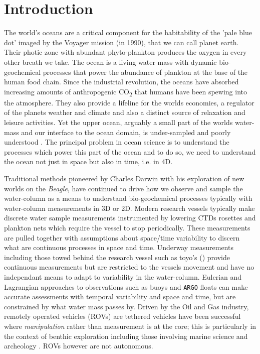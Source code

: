 \section{Introduction}

The world's oceans are a critical component for the habitability of
the 'pale blue dot' imaged by the Voyager mission (in 1990), that we
can call planet earth. Their photic zone with abundant phyto-plankton
produces the oxygen in every other breath we take. The ocean is a
living water mass with dynamic bio-geochemical processes that power
the abundance of plankton at the base of the human food chain.  Since
the industrial revolution, the oceans have absorbed increasing amounts
of anthropogenic CO\textsubscript{2} that humans have been spewing
into the atmosphere. They also provide a lifeline for the worlds
economies, a regulator of the planets weather and climate and also a
distinct source of relaxation and leisure activities. Yet the upper
ocean, arguably a small part of the worlds water-mass and our
interface to the ocean domain, is under-sampled and poorly understood
\cite{munk2002}. The principal problem in ocean science is to
understand the processes which power this part of the ocean and to do
so, we need to understand the ocean not just in space but also in
time, i.e. in 4D.

Traditional methods pioneered by Charles Darwin with his exploration
of new worlds on the \emph{Beagle}, have continued to drive how we
observe and sample the water-column as a means to understand
bio-geochemical processes typically with water-column measurements in
3D or 2D.  Modern research vessels typically make discrete water
sample measurements instrumented by lowering CTDs rosettes and
plankton nets which require the vessel to stop periodically. These
measurements are pulled together with assumptions about space/time
variability to discern what are continuous processes in space and
time. Underway measurements including those towed behind the research
vessel such as toyo's () provide continuous measurements but
are restricted to the vessels movement and have no independant means
to adapt to variability in the water-column. Eulerian and Lagrangian
approaches to observations such as buoys and \texttt{ARGO} floats
\cite{roemmich09} can make accurate assessments with temporal
variability and space and time, but are constrained by what water mass
passes by. Driven by the Oil and Gas industry, remotely operated
vehicles (ROVs) are tethered vehicles have been successful where
\emph{manipulation} rather than measurement is at the core; this is
particularly in the context of benthic exploration including those
involving marine science \cite{yoerger00,robi17} and archeology
\cite{coleman00}. ROVs however are not autonomous.


